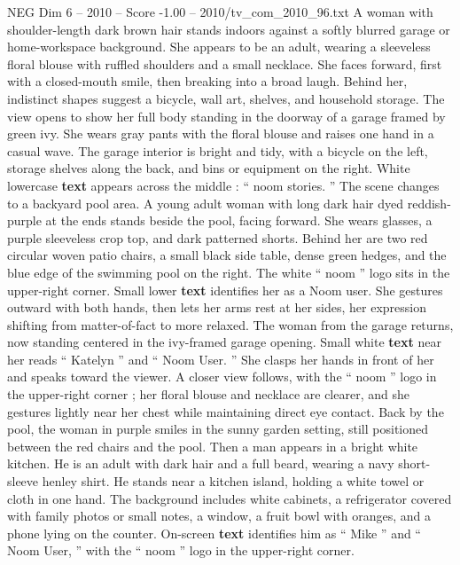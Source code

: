 \begin{textsample}{NEG Dim 6 – 2010 – Score -1.00 – 2010/tv\_com\_2010\_96.txt}  \label{ex:f6_neg_020}
A woman with shoulder-length dark brown hair stands indoors against a softly blurred garage or home-workspace background.
She appears to be an adult, wearing a sleeveless floral blouse with ruffled shoulders and a small necklace.
She faces forward, first with a closed-mouth smile, then breaking into a broad laugh.
Behind her, indistinct shapes suggest a bicycle, wall art, shelves, and household storage.
The view opens to show her full body standing in the doorway of a garage framed by green ivy.
She wears gray pants with the floral blouse and raises one hand in a casual wave.
The garage interior is bright and tidy, with a bicycle on the left, storage shelves along the back, and bins or equipment on the right.
White lowercase \textbf{text} appears across the middle : “ noom stories. ” The scene changes to a backyard pool area.
A young adult woman with long dark hair dyed reddish-purple at the ends stands beside the pool, facing forward.
She wears glasses, a purple sleeveless crop top, and dark patterned shorts.
Behind her are two red circular woven patio chairs, a small black side table, dense green hedges, and the blue edge of the swimming pool on the right.
The white “ noom ” logo sits in the upper-right corner.
Small lower \textbf{text} identifies her as a Noom user.
She gestures outward with both hands, then lets her arms rest at her sides, her expression shifting from matter-of-fact to more relaxed.
The woman from the garage returns, now standing centered in the ivy-framed garage opening.
Small white \textbf{text} near her reads “ Katelyn ” and “ Noom User. ” She clasps her hands in front of her and speaks toward the viewer.
A closer view follows, with the “ noom ” logo in the upper-right corner ; her floral blouse and necklace are clearer, and she gestures lightly near her chest while maintaining direct eye contact.
Back by the pool, the woman in purple smiles in the sunny garden setting, still positioned between the red chairs and the pool.
Then a man appears in a bright white kitchen.
He is an adult with dark hair and a full beard, wearing a navy short-sleeve henley shirt.
He stands near a kitchen island, holding a white towel or cloth in one hand.
The background includes white cabinets, a refrigerator covered with family photos or small notes, a window, a fruit bowl with oranges, and a phone lying on the counter.
On-screen \textbf{text} identifies him as “ Mike ” and “ Noom User, ” with the “ noom ” logo in the upper-right corner.

\end{textsample}
